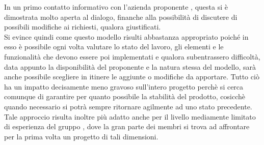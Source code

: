 In un primo contatto informativo con l'azienda proponente \proponente{}, questa si è dimostrata molto aperta al dialogo, finanche alla possibilità di discutere di possibili modifiche ai  richiesti, qualora giustificati.\\
Si evince quindi come questo modello risulti abbastanza appropriato poiché in esso è possibile ogni volta valutare lo stato del lavoro, gli elementi e le funzionalità che devono essere poi implementati e qualora subentrassero difficoltà, data appunto la disponibilità del proponente e la natura stessa del modello, sarà anche possibile scegliere in itinere le aggiunte o modifiche da apportare. Tutto ciò ha un impatto decisamente meno gravoso sull'intero progetto perchè si cerca comunque di garantire per quanto possibile la stabilità del prodotto, cosicchè quando necessario si potrà sempre ritornare agilmente ad uno stato precedente. \\
Tale approccio risulta inoltre più adatto anche per il livello mediamente limitato di esperienza del gruppo \Gruppo{}, dove la gran parte dei membri si trova ad affrontare per la prima volta un progetto di tali dimensioni.